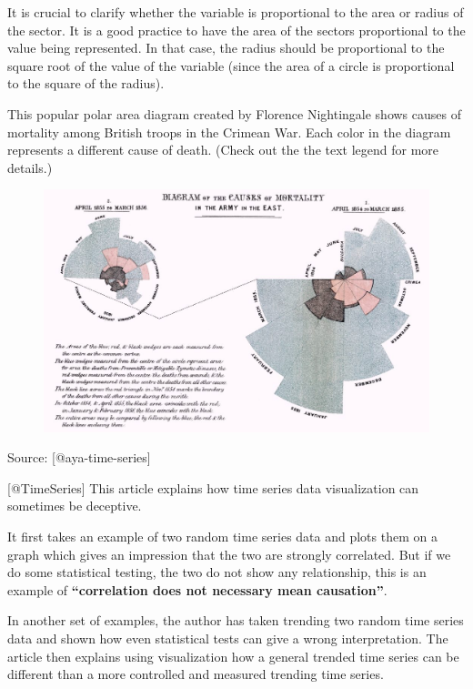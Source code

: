\documentclass[]{book}
\theoremstyle{definition}
\theoremstyle{definition}
\theoremstyle{definition}
\theoremstyle{remark}
\begin{document}
It is crucial to clarify whether the variable is proportional to the
area or radius of the sector. It is a good practice to have the area of
the sectors proportional to the value being represented. In that case,
the radius should be proportional to the square root of the value of the
variable (since the area of a circle is proportional to the square of
the radius).

This popular polar area diagram created by Florence Nightingale shows
causes of mortality among British troops in the Crimean War. Each color
in the diagram represents a different cause of death. (Check out the the
text legend for more details.)

\begin{figure}
\centering
\includegraphics{images/aya-polar.jpg}
\caption{}
\end{figure}

Source: {[}@aya-time-series{]}

{[}@TimeSeries{]} This article explains how time series data
visualization can sometimes be deceptive.

It first takes an example of two random time series data and plots them
on a graph which gives an impression that the two are strongly
correlated. But if we do some statistical testing, the two do not show
any relationship, this is an example of \textbf{``correlation does not
necessary mean causation''}.

In another set of examples, the author has taken trending two random
time series data and shown how even statistical tests can give a wrong
interpretation. The article then explains using visualization how a
general trended time series can be different than a more controlled and
measured trending time series.
\end{document}
